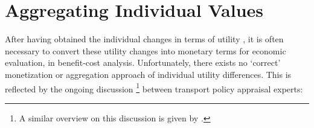\section{Aggregating Individual Values}
\label{ch:economicEval:aggregatingValues}
After having obtained the individual changes in terms of utility%
%
%
, it is often necessary to convert these utility changes into monetary terms for economic evaluation, \eg in benefit-cost analysis.
%
Unfortunately, there exists no `correct' monetization or aggregation approach of individual utility differences. This is reflected by the ongoing discussion%
%
\footnote{
%
A similar overview on this discussion is given by 
\citet{BoerjessonEliasson2014SwedishVTTS}.
%
}
%
between transport policy appraisal experts:
%
